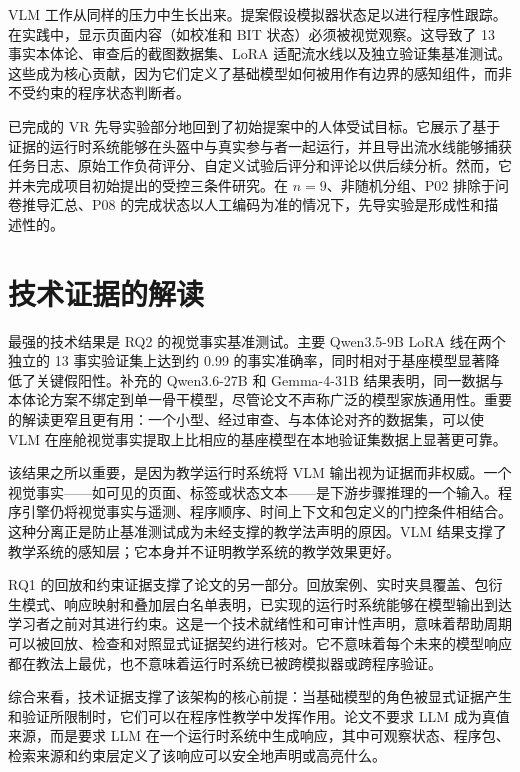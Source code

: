 VLM 工作从同样的压力中生长出来。提案假设模拟器状态足以进行程序性跟踪。在实践中，显示页面内容（如校准和 BIT 状态）必须被视觉观察。这导致了 13 事实本体论、审查后的截图数据集、LoRA 适配流水线以及独立验证集基准测试。这些成为核心贡献，因为它们定义了基础模型如何被用作有边界的感知组件，而非不受约束的程序状态判断者。

已完成的 VR 先导实验部分地回到了初始提案中的人体受试目标。它展示了基于证据的运行时系统能够在头盔中与真实参与者一起运行，并且导出流水线能够捕获任务日志、原始工作负荷评分、自定义试验后评分和评论以供后续分析。然而，它并未完成项目初始提出的受控三条件研究。在 $n=9$、非随机分组、P02 排除于问卷推导汇总、P08 的完成状态以人工编码为准的情况下，先导实验是形成性和描述性的。

\section{技术证据的解读}\label{sec:disc-interpretation}

最强的技术结果是 RQ2 的视觉事实基准测试。主要 Qwen3.5-9B LoRA 线在两个独立的 13 事实验证集上达到约 0.99 的事实准确率，同时相对于基座模型显著降低了关键假阳性。补充的 Qwen3.6-27B 和 Gemma-4-31B 结果表明，同一数据与本体论方案不绑定到单一骨干模型，尽管论文不声称广泛的模型家族通用性。重要的解读更窄且更有用：一个小型、经过审查、与本体论对齐的数据集，可以使 VLM 在座舱视觉事实提取上比相应的基座模型在本地验证集数据上显著更可靠。

该结果之所以重要，是因为教学运行时系统将 VLM 输出视为证据而非权威。一个视觉事实——如可见的页面、标签或状态文本——是下游步骤推理的一个输入。程序引擎仍将视觉事实与遥测、程序顺序、时间上下文和包定义的门控条件相结合。这种分离正是防止基准测试成为未经支撑的教学法声明的原因。VLM 结果支撑了教学系统的感知层；它本身并不证明教学系统的教学效果更好。

RQ1 的回放和约束证据支撑了论文的另一部分。回放案例、实时夹具覆盖、包衍生模式、响应映射和叠加层白名单表明，已实现的运行时系统能够在模型输出到达学习者之前对其进行约束。这是一个技术就绪性和可审计性声明，意味着帮助周期可以被回放、检查和对照显式证据契约进行核对。它不意味着每个未来的模型响应都在教法上最优，也不意味着运行时系统已被跨模拟器或跨程序验证。

综合来看，技术证据支撑了该架构的核心前提：当基础模型的角色被显式证据产生和验证所限制时，它们可以在程序性教学中发挥作用。论文不要求 LLM 成为真值来源，而是要求 LLM 在一个运行时系统中生成响应，其中可观察状态、程序包、检索来源和约束层定义了该响应可以安全地声明或高亮什么。


